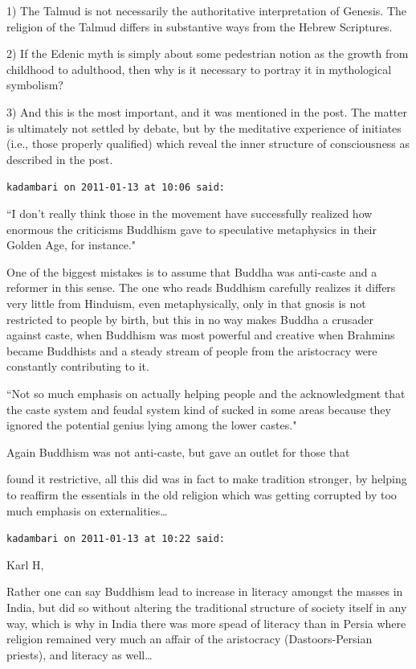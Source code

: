 \begin{footnotesize}
\begin{sffamily}
1) The Talmud is not necessarily the authoritative interpretation of Genesis. The religion of the Talmud differs in substantive ways from the Hebrew Scriptures.

2) If the Edenic myth is simply about some pedestrian notion as the growth from childhood to adulthood, then why is it necessary to portray it in mythological symbolism?

3) And this is the most important, and it was mentioned in the post. The matter is ultimately not settled by debate, but by the meditative experience of initiates (i.e., those properly qualified) which reveal the inner structure of consciousness as described in the post.


\hfill

\texttt{kadambari on 2011-01-13 at 10:06 said: }

``I don't really think those in the movement have successfully realized how enormous the criticisms Buddhism gave to speculative metaphysics in their Golden Age, for instance."

One of the biggest mistakes is to assume that Buddha was anti-caste and a reformer in this sense. The one who reads Buddhism carefully realizes it differs very little from Hinduism, even metaphysically, only in that gnosis is not restricted to people by birth, but this in no way makes Buddha a crusader against caste, when Buddhism was most powerful and creative when Brahmins became Buddhists and a steady stream of people from the aristocracy were constantly contributing to it.

``Not so much emphasis on actually helping people and the acknowledgment that the caste system and feudal system kind of sucked in some areas because they ignored the potential genius lying among the lower castes."

Again Buddhism was not anti-caste, but gave an outlet for those that

found it restrictive, all this did was in fact to make tradition stronger, by helping to reaffirm the essentials in the old religion which was getting corrupted by too much emphasis on externalities…


\hfill

\texttt{kadambari on 2011-01-13 at 10:22 said: }

Karl H,

Rather one can say Buddhism lead to increase in literacy amongst the masses in India, but did so without altering the traditional structure of society itself in any way, which is why in India there was more spead of literacy than in Persia where religion remained very much an affair of the aristocracy (Dastoors-Persian priests), and literacy as well…


\hfill


\end{sffamily}\end{footnotesize}
